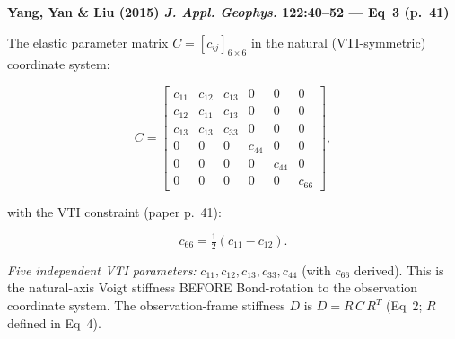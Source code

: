 \noindent\textbf{Yang, Yan \& Liu (2015) \emph{J. Appl. Geophys.} 122:40--52 — Eq~3 (p.~41)}

\smallskip

\noindent The elastic parameter matrix $C = [c_{ij}]_{6\times 6}$ in the natural
(VTI-symmetric) coordinate system:

\smallskip

\begin{equation}
C =
\begin{bmatrix}
c_{11} & c_{12} & c_{13} & 0      & 0      & 0     \\
c_{12} & c_{11} & c_{13} & 0      & 0      & 0     \\
c_{13} & c_{13} & c_{33} & 0      & 0      & 0     \\
0      & 0      & 0      & c_{44} & 0      & 0     \\
0      & 0      & 0      & 0      & c_{44} & 0     \\
0      & 0      & 0      & 0      & 0      & c_{66}
\end{bmatrix},
\tag{3}
\end{equation}

\smallskip

\noindent with the VTI constraint (paper p.~41):

\begin{equation*}
c_{66} = \tfrac{1}{2}(c_{11} - c_{12}).
\end{equation*}

\smallskip

\noindent\textit{Five independent VTI parameters:}
$c_{11}, c_{12}, c_{13}, c_{33}, c_{44}$ (with $c_{66}$ derived).
This is the natural-axis Voigt stiffness BEFORE Bond-rotation to the
observation coordinate system. The observation-frame stiffness $D$ is
$D = R\,C\,R^T$ (Eq~2; $R$ defined in Eq~4).
